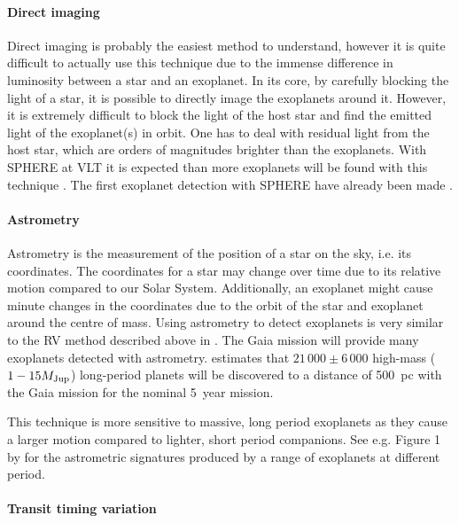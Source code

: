 \paragraph{Direct imaging}

Direct imaging is probably the easiest method to understand, however it is quite difficult to
actually use this technique due to the immense difference in luminosity between a star and an
exoplanet. In its core, by carefully blocking the light of a star, it is possible to directly image
the exoplanets around it. However, it is extremely difficult to block the light of the host star and
find the emitted light of the exoplanet(s) in orbit. One has to deal with residual light from the
host star, which are orders of magnitudes brighter than the exoplanets. With SPHERE at VLT it is
expected than more exoplanets will be found with this technique \citep{Beuzit2008}. The first
exoplanet detection with SPHERE have already been made \citep[see
e.g.]{Vigan2016,Bonnefoy2016,Apai2016,Maire2016,Zurlo2016}.


\paragraph{Astrometry}

Astrometry is the measurement of the position of a star on the sky, i.e. its coordinates. The
coordinates for a star may change over time due to its relative motion compared to our Solar System.
Additionally, an exoplanet might cause minute changes in the coordinates due to the orbit of the
star and exoplanet around the centre of mass. Using astrometry to detect exoplanets is very similar
to the RV method described above in . The Gaia mission \citep{GAIA} will provide
many exoplanets detected with astrometry. \citet{Perryman2014} estimates that $21\,000\pm6\,000$
high-mass ($1-15M_\mathrm{Jup}$) long-period planets will be discovered to a distance of \SI{500}{pc} with
the Gaia mission for the nominal \SI{5}{year} mission.

This technique is more sensitive to massive, long period exoplanets as they cause a larger motion
compared to lighter, short period companions. See e.g. Figure 1 by \citet{Perryman2014} for the
astrometric signatures produced by a range of exoplanets at different period.


\paragraph{Transit timing variation}

